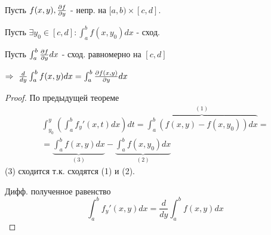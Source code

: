 \documentclass{article}
\begin{document}
\begin{theorem}
  \phantom{.}

  Пусть $f(x,y), \frac{\partial{f}}{\partial{y}}$ - непр. на $[a,b)\times [c,d]$.

  Пусть $\exists y_0 \in [c,d]: \int_{a}^{b}f(x,y_0)dx$ - сход.

  Пусть $\int_{a}^{b}\frac{\partial{f}}{\partial{y}}dx$ - сход. равномерно на $[c,d]$

  $\implies \ \frac{d}{dy}\int_{a}^{b}f(x,y)dx=\int_{a}^{b}\pd{f(x,y)}{y}dx$
\end{theorem}
\begin{proof}
  По предыдущей теореме
  \begin{gather*}
    \int_{y_0}^{y}(\int_{a}^{b}f_y'(x,t)dx)dt=\overbrace{\int_{a}^{b}(f(x,y)-f(x,y_0))dx}^{(1)} = \\ 
    =\underbrace{\int_{a}^{b}f(x,y)dx}_{(3)} - \underbrace{\int_{a}^{b}f(x,y_0)dx}_{(2)}
  \end{gather*}
  (3) сходится т.к. сходятся (1) и (2).
  
  Дифф. полученное равенство
  \[
    \int_{a}^{b}f_y'(x,y)dx=\frac{d}{dy}\int_{a}^{b}f(x,y)dx
  \]
\end{proof}
\end{document}
